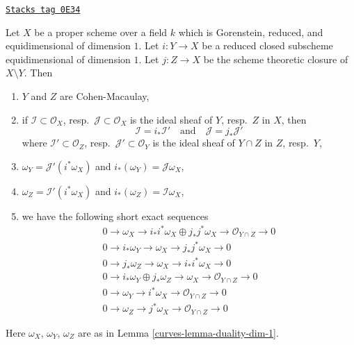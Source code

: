 \begin{lemma}
\label{curves-lemma-closed-subscheme-reduced-gorenstein}
\href{https://stacks.math.columbia.edu/tag/0E34}{\texttt{Stacks tag 0E34}}

Let $X$ be a proper scheme over a field $k$ which is
Gorenstein, reduced, and equidimensional of dimension $1$.
Let $i : Y \to X$ be a reduced closed subscheme equidimensional
of dimension $1$. Let $j : Z \to X$ be the scheme theoretic
closure of $X \setminus Y$. Then
\begin{enumerate}
\item $Y$ and $Z$ are Cohen-Macaulay,
\item if $\mathcal{I} \subset \mathcal{O}_X$,
resp.\ $\mathcal{J} \subset \mathcal{O}_X$ is the ideal sheaf of
$Y$, resp.\ $Z$ in $X$, then
$$
\mathcal{I} = i_*\mathcal{I}'
\quad\text{and}\quad
\mathcal{J} = j_*\mathcal{J}'
$$
where $\mathcal{I}' \subset \mathcal{O}_Z$,
resp.\ $\mathcal{J}' \subset \mathcal{O}_Y$ is the ideal sheaf
of $Y \cap Z$ in $Z$, resp.\ $Y$,
\item $\omega_Y = \mathcal{J}'(i^*\omega_X)$ and
$i_*(\omega_Y) = \mathcal{J}\omega_X$,
\item $\omega_Z = \mathcal{I}'(i^*\omega_X)$ and
$i_*(\omega_Z) = \mathcal{I}\omega_X$,
\item we have the following short exact sequences
\begin{align*}
0 \to \omega_X \to i_*i^*\omega_X \oplus j_*j^*\omega_X \to
\mathcal{O}_{Y \cap Z} \to 0 \\
0 \to i_*\omega_Y \to \omega_X \to j_*j^*\omega_X \to 0 \\
0 \to j_*\omega_Z \to \omega_X \to i_*i^*\omega_X \to 0 \\
0 \to i_*\omega_Y \oplus j_*\omega_Z \to \omega_X \to
\mathcal{O}_{Y \cap Z} \to 0 \\
0 \to \omega_Y \to i^*\omega_X \to \mathcal{O}_{Y \cap Z} \to 0 \\
0 \to \omega_Z \to j^*\omega_X \to \mathcal{O}_{Y \cap Z} \to 0
\end{align*}
\end{enumerate}
Here $\omega_X$, $\omega_Y$, $\omega_Z$ are as in
Lemma \ref{curves-lemma-duality-dim-1}.
\end{lemma}

